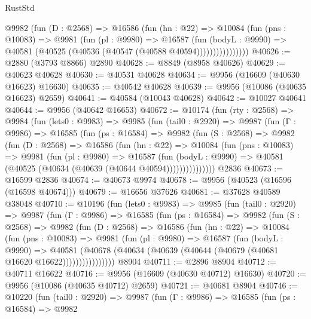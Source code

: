 \begin{lexlean}{RustStd}
\begin{coremodule}
                @9982
                  (fun (D : @2568) =>
                  @16586
                    (fun (hn : @22) =>
                    @10084
                      (fun (pns : @10083) =>
                      @9981
                        (fun (pl : @9980) =>
                        @16587
                          (fun (bodyL : @9990) =>
                          @40581 (@40525 (@40536 (@40547 (@40588 @40594))))))))))))))))
@40626 := @2880 (@3793 @8866) @2890
@40628 := @8849 (@8958 @40626)
@40629 := @40623 @40628
@40630 := @40531 @40628
@40634 := @9956 (@16609 (@40630 @16623) @16630)
@40635 := @40542 @40628
@40639 := @9956 (@10086 (@40635 @16623) @2659)
@40641 := @40584 (@10043 @40628)
@40642 := @10027 @40641
@40644 := @9956 (@40642 @16653)
@40672 := @10174
    (fun (rty : @2568) =>
    @9984
      (fun (lets0 : @9983) =>
      @9985
        (fun (tail0 : @2920) =>
        @9987
          (fun (Γ : @9986) =>
          @16585
            (fun (ps : @16584) =>
            @9982
              (fun (S : @2568) =>
              @9982
                (fun (D : @2568) =>
                @16586
                  (fun (hn : @22) =>
                  @10084
                    (fun (pns : @10083) =>
                    @9981
                      (fun (pl : @9980) =>
                      @16587
                        (fun (bodyL : @9990) =>
                        @40581 (@40525 (@40634 (@40639 (@40644 @40594)))))))))))))))
    @2836
@40673 := @16599 @2836
@40674 := @40673 @9974
@40678 := @9956 (@40523 (@16596 (@16598 @40674)))
@40679 := @16656 @37626
@40681 := @37628 @40589 @38048
@40710 := @10196
    (fun (lets0 : @9983) =>
    @9985
      (fun (tail0 : @2920) =>
      @9987
        (fun (Γ : @9986) =>
        @16585
          (fun (ps : @16584) =>
          @9982
            (fun (S : @2568) =>
            @9982
              (fun (D : @2568) =>
              @16586
                (fun (hn : @22) =>
                @10084
                  (fun (pns : @10083) =>
                  @9981
                    (fun (pl : @9980) =>
                    @16587
                      (fun (bodyL : @9990) =>
                      @40581
                        (@40678
                          (@40634 (@40639 (@40644 (@40679 (@40681 @16620 @16622))))))))))))))))
    @8904
@40711 := @2896 @8904
@40712 := @40711 @16622
@40716 := @9956 (@16609 (@40630 @40712) @16630)
@40720 := @9956 (@10086 (@40635 @40712) @2659)
@40721 := @40681 @8904
@40746 := @10220
    (fun (tail0 : @2920) =>
    @9987
      (fun (Γ : @9986) =>
      @16585
        (fun (ps : @16584) =>
        @9982

\end{coremodule}
\end{lexlean}
